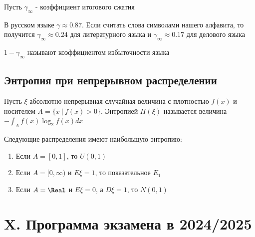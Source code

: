 \documentclass[12pt]{article}
\begin{document}
Пусть $\gamma_\infty$ - коэффициент итогового сжатия


В русском языке $\gamma \approx 0.87$. Если считать слова символами нашего алфавита, 
то получится $\gamma_\infty \approx 0.24$ для литературного языка и
$\gamma_\infty \approx 0.17$ для делового языка

\Def $1 - \gamma_\infty$ называют коэффициентом избыточности языка

\subsection{Энтропия при непрерывном распределении}

\Def Пусть $\xi$ абсолютно непрерывная случайная величина с плотностью $f(x)$ и носителем $A = \{x \ | \ f(x) > 0\}$. Энтропией $H(\xi)$ называется
величина $-\int_A f(x) \log_2 f(x) dx$

\begin{MyTheorem}
    \Ths Следующие распределения имеют наибольшую энтропию:

    \begin{enumerate}
        \item Если $A = [0, 1]$, то $U(0, 1)$

        \item Если $A = [0, \infty)$ и $E\xi = 1$, то показательное $E_1$

        \item Если $A = \Real$ и $E\xi = 0$, а $D\xi = 1$, то $N(0, 1)$
    \end{enumerate}
\end{MyTheorem}

\clearpage

\section{X. Программа экзамена в 2024/2025}
\end{document}
